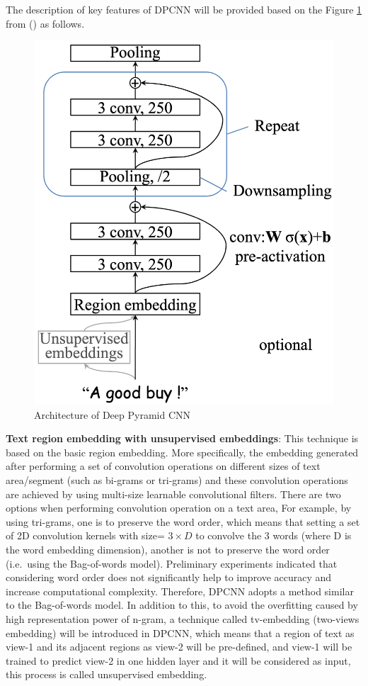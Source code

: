 \documentclass[]{krantz}
\begin{document}
The description of key features of DPCNN will be provided based on the Figure \ref{fig:figs-11} from (\citet{Johnson2017DeepPC}) as follows.

\begin{figure}[ht]

{\centering \includegraphics[width=0.35\linewidth]{figures/01-03-cnns-and-their-applications-in-nlp/DPCNN} 

}

\caption{\label{fig:fig_11} Architecture of Deep Pyramid CNN}\label{fig:figs-11}
\end{figure}

\textbf{Text region embedding with unsupervised embeddings}: This technique is based on the basic region embedding. More specifically, the embedding generated after performing a set of convolution operations on different sizes of text area/segment (such as bi-grams or tri-grams) and these convolution operations are achieved by using multi-size learnable convolutional filters. There are two options when performing convolution operation on a text area, For example, by using tri-grams, one is to preserve the word order, which means that setting a set of 2D convolution kernels with size= \(3 \times D\) to convolve the 3 words (where D is the word embedding dimension), another is not to preserve the word order (i.e.~using the Bag-of-words model). Preliminary experiments indicated that considering word order does not significantly help to improve accuracy and increase computational complexity. Therefore, DPCNN adopts a method similar to the Bag-of-words model. In addition to this, to avoid the overfitting caused by high representation power of n-gram, a technique called tv-embedding (two-views embedding) will be introduced in DPCNN, which means that a region of text as view-1 and its adjacent regions as view-2 will be pre-defined, and view-1 will be trained to predict view-2 in one hidden layer and it will be considered as input, this process is called unsupervised embedding.
\end{document}

